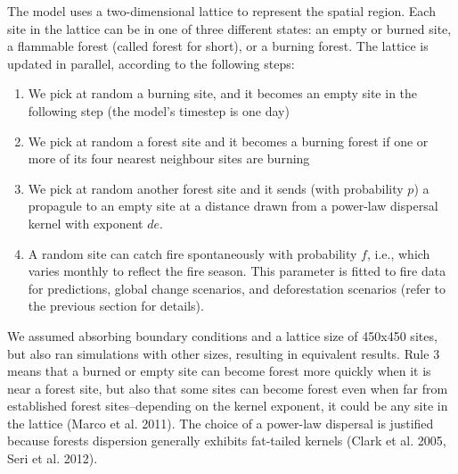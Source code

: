 \documentclass[
]{article}
\begin{document}
The model uses a two-dimensional lattice to represent the spatial
region. Each site in the lattice can be in one of three different
states: an empty or burned site, a flammable forest (called forest for
short), or a burning forest. The lattice is updated in parallel,
according to the following steps:

\begin{enumerate}
\def\labelenumi{\arabic{enumi}.}
\item
  We pick at random a burning site, and it becomes an empty site in the
  following step (the model's timestep is one day)
\item
  We pick at random a forest site and it becomes a burning forest if one
  or more of its four nearest neighbour sites are burning
\item
  We pick at random another forest site and it sends (with probability
  \(p\)) a propagule to an empty site at a distance drawn from a
  power-law dispersal kernel with exponent \(de\).
\item
  A random site can catch fire spontaneously with probability \(f\),
  i.e., which varies monthly to reflect the fire season. This parameter
  is fitted to fire data for predictions, global change scenarios, and
  deforestation scenarios (refer to the previous section for details).
\end{enumerate}

We assumed absorbing boundary conditions and a lattice size of 450x450
sites, but also ran simulations with other sizes, resulting in
equivalent results. Rule 3 means that a burned or empty site can become
forest more quickly when it is near a forest site, but also that some
sites can become forest even when far from established forest
sites--depending on the kernel exponent, it could be any site in the
lattice (Marco et al. 2011). The choice of a power-law dispersal is
justified because forests dispersion generally exhibits fat-tailed
kernels (Clark et al. 2005, Seri et al. 2012).
\end{document}
